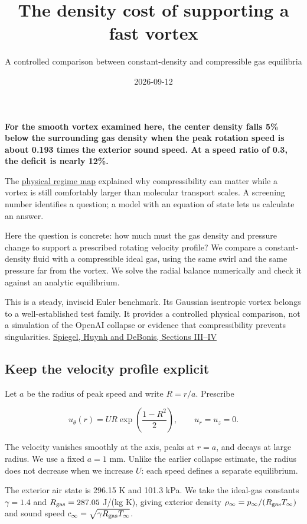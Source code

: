 \documentclass[
  english,
  11pt,
]{article}
\title{The density cost of supporting a fast vortex}
\subtitle{A controlled comparison between constant-density and
compressible gas equilibria}
\author{}
\date{2026-09-12}
\begin{document}
\maketitle


\textbf{For the smooth vortex examined here, the center density falls
5\% below the surrounding gas density when the peak rotation speed is
about 0.193 times the exterior sound speed. At a speed ratio of 0.3, the
deficit is nearly 12\%.}

The \href{../d9_regime_map/article.html}{physical regime map} explained
why compressibility can matter while a vortex is still comfortably
larger than molecular transport scales. A screening number identifies a
question; a model with an equation of state lets us calculate an answer.

Here the question is concrete: how much must the gas density and
pressure change to support a prescribed rotating velocity profile? We
compare a constant-density fluid with a compressible ideal gas, using
the same swirl and the same pressure far from the vortex. We solve the
radial balance numerically and check it against an analytic equilibrium.

This is a steady, inviscid Euler benchmark. Its Gaussian isentropic
vortex belongs to a well-established test family. It provides a
controlled physical comparison, not a simulation of the OpenAI collapse
or evidence that compressibility prevents singularities.
\href{https://ntrs.nasa.gov/api/citations/20150018403/downloads/20150018403.pdf}{Spiegel,
Huynh and DeBonis, Sections III--IV}

\subsection{Keep the velocity profile
explicit}\label{keep-the-velocity-profile-explicit}

Let \(a\) be the radius of peak speed and write \(R=r/a\). Prescribe

\[
u_\theta(r)=U R\exp\!\left(\frac{1-R^2}{2}\right),\qquad u_r=u_z=0.
\]

The velocity vanishes smoothly at the axis, peaks at \(r=a\), and decays
at large radius. We use a fixed \(a=1\) mm. Unlike the earlier collapse
estimate, the radius does not decrease when we increase \(U\): each
speed defines a separate equilibrium.

The exterior air state is 296.15 K and 101.3 kPa. We take the ideal-gas
constants \(\gamma=1.4\) and \(R_{\rm gas}=287.05\) J/(kg K), giving
exterior density \(\rho_\infty=p_\infty/(R_{\rm gas}T_\infty)\) and
sound speed \(c_\infty=\sqrt{\gamma R_{\rm gas}T_\infty}\).
\end{document}
